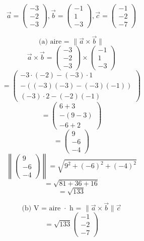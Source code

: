 \documentclass{article}
\begin{document}
\[ \vec{a} = \begin{pmatrix} -3 \\ -2 \\ -3 \end{pmatrix}, \vec{b} = \begin{pmatrix} -1 \\ 1 \\ -3 \end{pmatrix}, \vec{c} = \begin{pmatrix} -1 \\ -2 \\ -7 \end{pmatrix} \]

\[\text{(a) aire = } \|\vec{a} \times \vec{b}\|\]
\[ \vec{a} \times \vec{b} = \begin{pmatrix} -3 \\ -2 \\ -3 \end{pmatrix} \times \begin{pmatrix} -1 \\ 1 \\ -3 \end{pmatrix} \]
\[ = \begin{pmatrix} -3\cdot(-2) - (-3)\cdot1 \\ -((-3)(-3) - (-3)(-1)) \\ (-3) \cdot 2 - (-2)(-1) \end{pmatrix} \]
\[ = \begin{pmatrix} 6 + 3 \\ -(9 - 3) \\ -6 + 2 \end{pmatrix} \]
\[ = \begin{pmatrix} 9 \\ -6 \\ -4 \end{pmatrix} \]
\[ \left\| \begin{pmatrix} 9 \\ -6 \\ -4 \end{pmatrix} \right\| = \sqrt{9^2 + (-6)^2 + (-4)^2} \]
\[ = \sqrt{81 + 36 + 16} \]
\[ = \sqrt{133} \]

\[\text{(b) V = aire } \cdot \text{ h = } \|\vec{a} \times \vec{b}\| \vec{c}\]
\[ = \sqrt{133} \begin{pmatrix} -1 \\ -2 \\ -7 \end{pmatrix} \]
\end{document}
